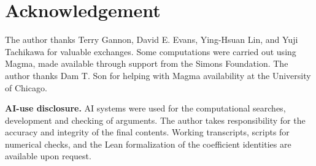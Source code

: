 \documentclass[11pt]{article}
\numberwithin{equation}{section}
\theoremstyle{definition}
\theoremstyle{remark}
\begin{document}
\section*{Acknowledgement}
The author thanks Terry Gannon, David E. Evans, Ying-Hsuan Lin, and Yuji Tachikawa for valuable exchanges. Some computations were carried out using Magma\cite{Magma}, made available through support from the Simons Foundation. The author thanks Dam T. Son for helping with Magma availability at the University of Chicago.

\noindent\textbf{AI-use disclosure.}
AI systems were used for the computational searches, development and
checking of arguments. The author takes responsibility for the accuracy
and integrity of the final contents. Working transcripts, scripts for
numerical checks, and the Lean formalization of the coefficient identities
are available upon request.
\end{document}
